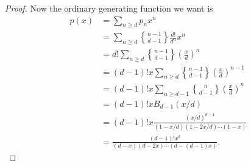 \documentclass{article}
\begin{document}
\begin{enumerate}[label={(\alph*)}]
\begin{proof}
        Now the ordinary generating function we want is
        \begin{align*}
          p(x) &=\sum_{n\geq d} p_n x^n\\
          &=\sum_{n\geq d} {n-1\brace d-1}\frac{d!}{d^n} x^n\\
          &=d! \sum_{n\geq d} {n-1\brace d-1} \left(\frac{x}{d}\right)^n\\
          &=(d-1)!x \sum_{n\geq d} {n-1\brace d-1}
            \left(\frac{x}{d}\right)^{n-1}\\
          &=(d-1)!x \sum_{n\geq d-1} {n\brace d-1}
            \left(\frac{x}{d}\right)^{n}\\
          &=(d-1)!x B_{d-1}(x/d)\\
          &=(d-1)!x \frac{(x/d)^{d-1}}{(1-x/d)(1-2x/d)\cdots(1-x)}\\
          &=\frac{(d-1)!x^d}{(d-x)(d-2x)\cdots(d-(d-1)x)}.
        \end{align*}
      \end{proof}
  \end{enumerate}
\end{document}
